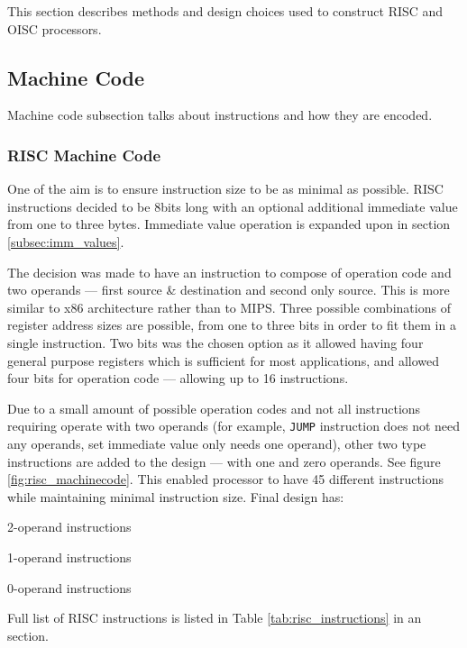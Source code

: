 This section describes methods and design choices used to construct RISC and OISC processors.

\subsection{Machine Code}\label{subsec:machine_code}
Machine code subsection talks about instructions and how they are encoded.

\subsubsection{RISC Machine Code}
One of the aim is to ensure instruction size to be as minimal as possible. RISC instructions decided to be 8bits long with an optional additional immediate value from one to three bytes. Immediate value operation is expanded upon in section \ref{subsec:imm_values}.

The decision was made to have an instruction to compose of operation code and two operands — first source \& destination and second only source. This is more similar to x86 architecture rather than to MIPS. Three possible combinations of register address sizes are possible, from one to three bits in order to fit them in a single instruction. Two bits was the chosen option as it allowed having four general purpose registers which is sufficient for most applications, and allowed four bits for operation code — allowing up to 16 instructions. 

Due to a small amount of possible operation codes and not all instructions requiring operate with two operands (for example, \texttt{JUMP} instruction does not need any operands, set immediate value only needs one operand), other two type instructions are added to the design — with one and zero operands. See figure \ref{fig:risc_machinecode}. This enabled processor to have 45 different instructions while maintaining minimal instruction size. Final design has:
\begin{description}[labelindent=1cm, labelsep=1em]
	\item[$\bullet$ \textbf{8 }]  2-operand instructions
	\item[$\bullet$ \textbf{32}]  1-operand instructions
	\item[$\bullet$ \textbf{5 }]  0-operand instructions
\end{description}
Full list of RISC instructions is listed in Table \ref{tab:risc_instructions} in an  section.

